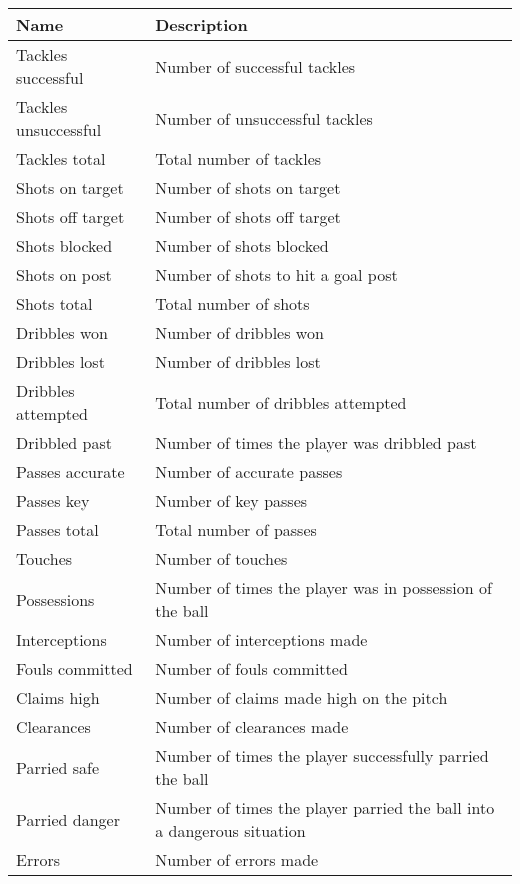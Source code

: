 \begin{table}[H]
    \centering
    \noindent\begin{tabulary}{\textwidth}{| L | L |}
        \hline
        \textbf{Name}           & \textbf{Description} \\\hline
        Tackles successful      & Number of successful tackles \\\hline
        Tackles unsuccessful    & Number of unsuccessful tackles \\\hline
        Tackles total           & Total number of tackles \\\hline
        
        Shots on target         & Number of shots on target \\\hline
        Shots off target        & Number of shots off target \\\hline
        Shots blocked           & Number of shots blocked \\\hline
        Shots on post           & Number of shots to hit a goal post \\\hline
        Shots total             & Total number of shots \\\hline
        
        Dribbles won            & Number of dribbles won \\\hline
        Dribbles lost           & Number of dribbles lost \\\hline
        Dribbles attempted      & Total number of dribbles attempted \\\hline
        Dribbled past           & Number of times the player was dribbled past \\\hline
        
        Passes accurate         & Number of accurate passes \\\hline
        Passes key              & Number of key passes \\\hline
        Passes total            & Total number of passes \\\hline
        
        Touches                 & Number of touches \\\hline
        Possessions             & Number of times the player was in possession of the ball \\\hline
        
        Interceptions           & Number of interceptions made \\\hline
        Fouls committed         & Number of fouls committed \\\hline
        Claims high             & Number of claims made high on the pitch \\\hline
        Clearances              & Number of clearances made \\\hline
        Parried safe            & Number of times the player successfully parried the ball \\\hline
        Parried danger          & Number of times the player parried the ball into a dangerous situation \\\hline
        Errors                  & Number of errors made \\\hline
        

\end{tabulary}
\end{table}
